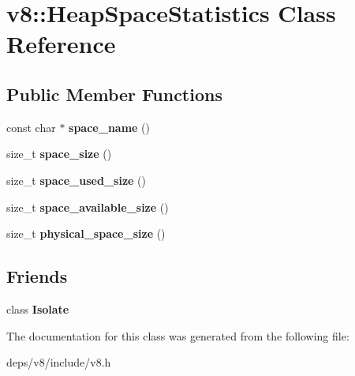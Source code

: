\hypertarget{classv8_1_1_heap_space_statistics}{}\section{v8\+:\+:Heap\+Space\+Statistics Class Reference}
\label{classv8_1_1_heap_space_statistics}
\subsection*{Public Member Functions}
\begin{DoxyCompactItemize}
\item 
\hypertarget{classv8_1_1_heap_space_statistics_a2114590101f48ff47f3ef25397f004a1}{}const char $\ast$ {\bfseries space\+\_\+name} ()\label{classv8_1_1_heap_space_statistics_a2114590101f48ff47f3ef25397f004a1}

\item 
\hypertarget{classv8_1_1_heap_space_statistics_aee3e8b2bad0716d45d0463ce5d0f23de}{}size\+\_\+t {\bfseries space\+\_\+size} ()\label{classv8_1_1_heap_space_statistics_aee3e8b2bad0716d45d0463ce5d0f23de}

\item 
\hypertarget{classv8_1_1_heap_space_statistics_ad7bbdfe5c8991e6e1b2da6d9d6a1a66b}{}size\+\_\+t {\bfseries space\+\_\+used\+\_\+size} ()\label{classv8_1_1_heap_space_statistics_ad7bbdfe5c8991e6e1b2da6d9d6a1a66b}

\item 
\hypertarget{classv8_1_1_heap_space_statistics_af700564f349f6f2fee72de97bd69c294}{}size\+\_\+t {\bfseries space\+\_\+available\+\_\+size} ()\label{classv8_1_1_heap_space_statistics_af700564f349f6f2fee72de97bd69c294}

\item 
\hypertarget{classv8_1_1_heap_space_statistics_a2ca295068884d9ea0162ad0a0391fc22}{}size\+\_\+t {\bfseries physical\+\_\+space\+\_\+size} ()\label{classv8_1_1_heap_space_statistics_a2ca295068884d9ea0162ad0a0391fc22}

\end{DoxyCompactItemize}
\subsection*{Friends}
\begin{DoxyCompactItemize}
\item 
\hypertarget{classv8_1_1_heap_space_statistics_aba4f0964bdacf2bbf62cf876e5d28d0a}{}class {\bfseries Isolate}\label{classv8_1_1_heap_space_statistics_aba4f0964bdacf2bbf62cf876e5d28d0a}

\end{DoxyCompactItemize}


The documentation for this class was generated from the following file\+:\begin{DoxyCompactItemize}
\item 
deps/v8/include/v8.\+h\end{DoxyCompactItemize}
